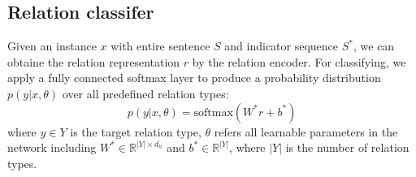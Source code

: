 \documentclass[conference]{IEEEtran}
\begin{document}
\subsection{Relation classifer}

Given an instance \begin{math} x \end{math} with entire sentence \begin{math} S \end{math} and indicator sequence \begin{math} S^* \end{math}, we can obtaine the relation representation \begin{math} r \end{math} by the relation encoder. For classifying, we apply a fully connected softmax layer to produce a probability distribution \begin{math} p\left(y | x, \theta\right) \end{math} over all predefined relation types:
\begin{equation}
p\left(y | x, \theta\right) =\text{softmax}\left(W^{*}r+b^{*}\right)
\end{equation}
where \begin{math} y \in Y \end{math} is the target relation type, \begin{math} \theta \end{math} refers all learnable parameters in the network including \begin{math} W^{*} \in \mathbb{R}^{|Y| \times d_{h}} \end{math} and \begin{math} b^{*} \in \mathbb{R}^{|Y|} \end{math}, where \begin{math} |Y| \end{math} is the number of relation types. 
\end{document}
